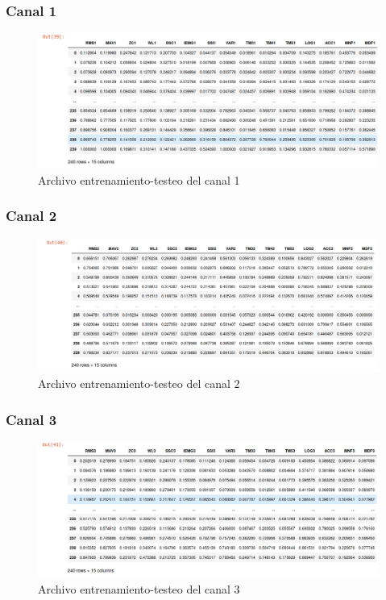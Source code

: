     \subsubsection{Canal 1}
        
        \begin{figure}[!ht]
            \centering
            \includegraphics[scale=0.38]{imagenes/datos canal 1.png}
            \caption{Archivo entrenamiento-testeo del canal 1}
            \label{fig:archivo1}
        \end{figure}
        
        \subsubsection{Canal 2}
        
        \begin{figure}[ht]
            \centering
            \includegraphics[scale=0.4]{imagenes/datos canal 2.png}
            \caption{Archivo entrenamiento-testeo del canal 2}
            \label{fig:archivo2}
        \end{figure}
        
        \subsubsection{Canal 3}
        \begin{figure}[ht]
            \centering
            \includegraphics[scale=0.4]{imagenes/datos canal 3.png}
            \caption{Archivo entrenamiento-testeo del canal 3}
            \label{fig:archivo3}
        \end{figure}
        
